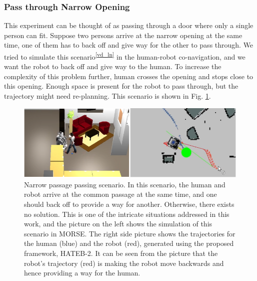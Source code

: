 \subsubsection{Pass through Narrow Opening}
This experiment can be thought of as passing through a door where only a single person can fit. Suppose two persons arrive at the narrow opening at the same time, one of them has to back off and give way for the other to pass through. We tried to simulate this scenario\textsuperscript{\ref{vd_ln}} in the human-robot co-navigation, and we want the robot to back off and give way to the human. To increase the complexity of this problem further, human crosses the opening and stops close to this opening. Enough space is present for the robot to pass through, but the trajectory might need re-planning. This scenario is shown in Fig. \ref{hateb2}. 
\begin{figure}[!h]
\centering
\includegraphics[width=0.9\columnwidth]{images/chapter3/hateb2.png}
\caption{Narrow passage passing scenario. In this scenario, the human and robot arrive at the common passage at the same time, and one should back off to provide a way for another. Otherwise, there exists no solution. This is one of the intricate situations addressed in this work, and the picture on the left shows the simulation of this scenario in MORSE. The right side picture shows the trajectories for the human (blue) and the robot (red), generated using the proposed framework, HATEB-2. It can be seen from the picture that the robot's trajectory (red) is making the robot move backwards and hence providing a way for the human.}
\label{hateb2}
\end{figure}


